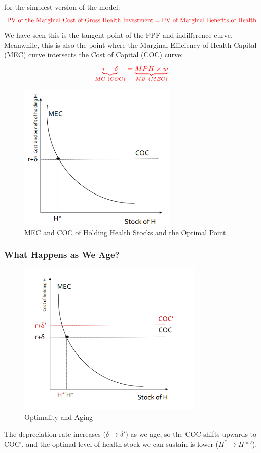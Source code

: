              for the simplest version of the model:
            \begin{equation*}
                \color{red} \text{PV of the Marginal Cost of Gross Health Investment} = \text{PV of Marginal Benefits of Health}
            \end{equation*}
            We have seen this is the tangent point of the PPF and indifference curve. Meanwhile, this is also the point where the Marginal Efficiency of Health Capital (MEC) curve intersects the Cost of Capital (COC) curve:
            \begin{equation*}
                \color{red} \underbrace{r+\delta}_{MC\ (COC)} = \underbrace{MPH \times w}_{MB\ (MEC)}
            \end{equation*}
            \begin{figure}[H]
                \centering
                \includegraphics[width=3in]{images/ch3/25.png}
                \caption{MEC and COC of Holding Health Stocks and the Optimal Point}
            \end{figure}

        \subsubsection{What Happens as We Age?}
            \begin{figure}[H]
                \centering
                \includegraphics[width=3.5in]{images/ch3/26.png}
                \caption{Optimality and Aging}
            \end{figure}
            The depreciation rate increases ($\delta \to \delta'$) as we age, so the COC shifts upwards to COC', and the optimal level of health stock we can sustain is lower ($H^* \to H*'$).

